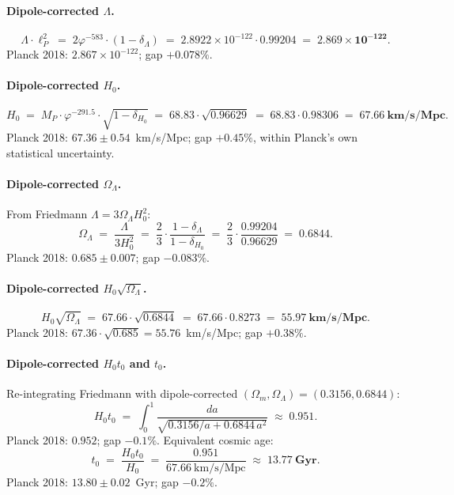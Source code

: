 \documentclass[11pt]{article}
\theoremstyle{plain}
\theoremstyle{definition}
\theoremstyle{remark}
\begin{document}
\paragraph{Dipole-corrected $\Lambda$.}
\[
  \Lambda \cdot \ell_P^2 \;=\; 2 \varphi^{-583} \cdot (1 - \delta_\Lambda) \;=\; 2.8922 \times 10^{-122} \cdot 0.99204 \;=\; \mathbf{2.869 \times 10^{-122}}.
\]
Planck 2018: $2.867 \times 10^{-122}$; gap $\mathbf{+0.078\%}$.

\paragraph{Dipole-corrected $H_0$.}
\[
  H_0 \;=\; M_P \cdot \varphi^{-291.5} \cdot \sqrt{1 - \delta_{H_0}} \;=\; 68.83 \cdot \sqrt{0.96629} \;=\; 68.83 \cdot 0.98306 \;=\; \mathbf{67.66~\text{km/s/Mpc}}.
\]
Planck 2018: $67.36 \pm 0.54$~km/s/Mpc; gap $\mathbf{+0.45\%}$, within Planck's own statistical uncertainty.

\paragraph{Dipole-corrected $\Omega_\Lambda$.} From Friedmann $\Lambda = 3 \Omega_\Lambda H_0^2$:
\[
  \Omega_\Lambda \;=\; \frac{\Lambda}{3 H_0^2} \;=\; \frac{2}{3} \cdot \frac{1 - \delta_\Lambda}{1 - \delta_{H_0}} \;=\; \frac{2}{3} \cdot \frac{0.99204}{0.96629} \;=\; \mathbf{0.6844}.
\]
Planck 2018: $0.685 \pm 0.007$; gap $\mathbf{-0.083\%}$.

\paragraph{Dipole-corrected $H_0 \sqrt{\Omega_\Lambda}$.}
\[
  H_0 \sqrt{\Omega_\Lambda} \;=\; 67.66 \cdot \sqrt{0.6844} \;=\; 67.66 \cdot 0.8273 \;=\; \mathbf{55.97~\text{km/s/Mpc}}.
\]
Planck 2018: $67.36 \cdot \sqrt{0.685} = 55.76$~km/s/Mpc; gap $\mathbf{+0.38\%}$.

\paragraph{Dipole-corrected $H_0 t_0$ and $t_0$.} Re-integrating Friedmann with dipole-corrected $(\Omega_m, \Omega_\Lambda) = (0.3156, 0.6844)$:
\[
  H_0 t_0 \;=\; \int_0^1 \frac{da}{\sqrt{0.3156/a + 0.6844 \, a^2}} \;\approx\; \mathbf{0.951}.
\]
Planck 2018: $0.952$; gap $\mathbf{-0.1\%}$. Equivalent cosmic age:
\[
  t_0 \;=\; \frac{H_0 t_0}{H_0} \;=\; \frac{0.951}{67.66~\text{km/s/Mpc}} \;\approx\; \mathbf{13.77~\text{Gyr}}.
\]
Planck 2018: $13.80 \pm 0.02$~Gyr; gap $\mathbf{-0.2\%}$.
\end{document}

